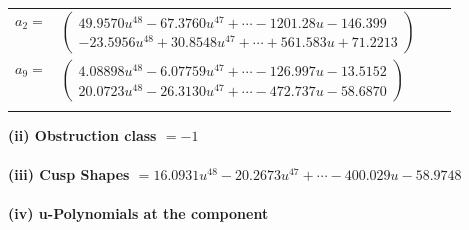 \documentclass[1p]{elsarticle_modified}
\theoremstyle{definition}
\begin{document}
\begin{tabular}{m{7pt} m{180pt} m{7pt} m{180pt} }
\flushright $a_{2}=$&$\begin{pmatrix}49.9570 u^{48}-67.3760 u^{47}+\cdots-1201.28 u-146.399\\-23.5956 u^{48}+30.8548 u^{47}+\cdots+561.583 u+71.2213\end{pmatrix}$ \\
\flushright $a_{9}=$&$\begin{pmatrix}4.08898 u^{48}-6.07759 u^{47}+\cdots-126.997 u-13.5152\\20.0723 u^{48}-26.3130 u^{47}+\cdots-472.737 u-58.6870\end{pmatrix}$\\&\end{tabular}
\flushleft \textbf{(ii) Obstruction class $= -1$}\\~\\
\flushleft \textbf{(iii) Cusp Shapes $= 16.0931 u^{48}-20.2673 u^{47}+\cdots-400.029 u-58.9748$}\\~\\
\newpage\renewcommand{\arraystretch}{1}
\flushleft \textbf{(iv) u-Polynomials at the component}\newline \\
\end{document}
